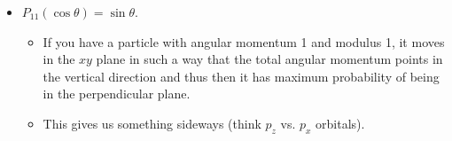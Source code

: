 \documentclass[../notes.tex]{subfiles}
\begin{document}
\begin{itemize}
\begin{itemize}
        \item $P_{11}(\cos\theta)=\sin\theta$.
        \begin{itemize}
            \item If you have a particle with angular momentum 1 and modulus 1, it moves in the $xy$ plane in such a way that the total angular momentum points in the vertical direction and thus then it has maximum probability of being in the perpendicular plane.
            \item This gives us something sideways (think $p_z$ vs. $p_x$ orbitals).
        \end{itemize}
    \end{itemize}
\end{itemize}
\end{document}
